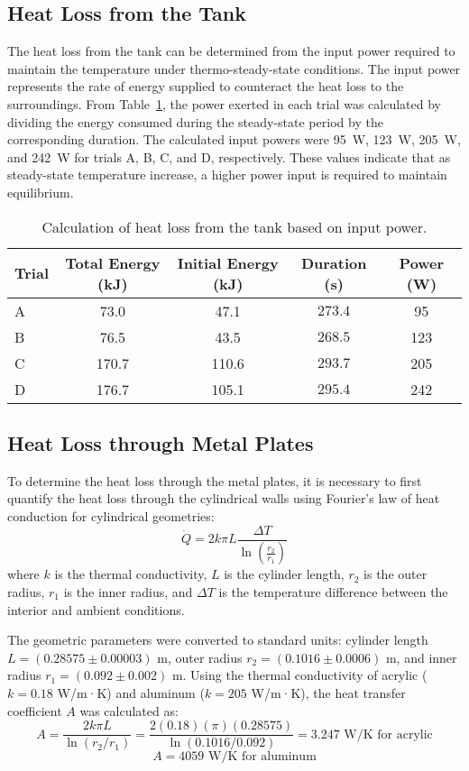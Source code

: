 \documentclass[12pt]{article}
\begin{document}
\subsection{Heat Loss from the Tank}
The heat loss from the tank can be determined from the input power required to maintain the temperature under thermo-steady-state conditions. The input power represents the rate of energy supplied to counteract the heat loss to the surroundings. From Table~\ref{tab:heatloss}, the power exerted in each trial was calculated by dividing the energy consumed during the steady-state period by the corresponding duration. The calculated input powers were 95~W, 123~W, 205~W, and 242~W for trials A, B, C, and D, respectively. These values indicate that as steady-state temperature increase, a higher power input is required to maintain equilibrium.

\begin{table}[h!]
\centering
\caption{Calculation of heat loss from the tank based on input power.}
\label{tab:heatloss}
\begin{tabular}{@{}lcccc@{}}
\toprule
\textbf{Trial} & \textbf{Total Energy (kJ)} & \textbf{Initial Energy (kJ)} & \textbf{Duration (s)} & \textbf{Power (W)} \\ \midrule
A & 73.0 & 47.1 & $273.4$ & 95 \\
B & 76.5 & 43.5 & $268.5$ & 123 \\
C & 170.7 & 110.6 & $293.7$ & 205 \\
D & 176.7 & 105.1 & $295.4$ & 242 \\ \bottomrule
\end{tabular}
\end{table}

\subsection{Heat Loss through Metal Plates}

To determine the heat loss through the metal plates, it is necessary to first quantify the heat loss through the cylindrical walls using Fourier's law of heat conduction for cylindrical geometries:
\[
\dot{Q} = 2k\pi L \frac{\Delta T}{\ln\left(\frac{r_2}{r_1}\right)}
\]
where \(k\) is the thermal conductivity, \(L\) is the cylinder length, \(r_2\) is the outer radius, \(r_1\) is the inner radius, and \(\Delta T\) is the temperature difference between the interior and ambient conditions.

The geometric parameters were converted to standard units: cylinder length \(L = (0.28575 \pm 0.00003)\) m, outer radius \(r_2 = (0.1016 \pm 0.0006)\) m, and inner radius \(r_1 = (0.092 \pm 0.002)\) m. Using the thermal conductivity of acrylic (\(k = 0.18\) W/m·K) and aluminum (\(k = 205\) W/m·K), the heat transfer coefficient \(A\) was calculated as:
\[
A = \frac{2k\pi L}{\ln(r_2/r_1)} = \frac{2(0.18)(\pi)(0.28575)}{\ln(0.1016/0.092)} = 3.247 \text{ W/K for acrylic}
\]
\[
A = 4059 \text{ W/K for aluminum}
\]
\end{document}
